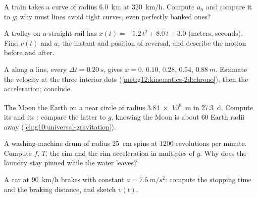 \begin{exercise}[$\star\star$]\label{exo:g12:kinematics-2d:6}
A  train takes a curve of radius \qty{6.0}{km} at
\qty{320}{km/h}. Compute $a_n$ and compare it to $g$; why must
 lines avoid tight curves, even perfectly banked ones?
\end{exercise}

\begin{exercise}[$\star\star$]\label{exo:g12:kinematics-2d:7}
A trolley on a straight rail has $x(t) = -1.2\,t^2 + 8.0\,t + 3.0$
(meters, seconds). Find $v(t)$ and $a$, the instant and position of
reversal, and describe the motion before and after.
\end{exercise}

\begin{exercise}[$\star\star$]\label{exo:g12:kinematics-2d:8}
A  along a line, every $\Delta t = \qty{0.20}{s}$,
gives $x = 0$, $0.10$, $0.28$, $0.54$, $\qty{0.88}{m}$. Estimate the
velocity at the three interior dots
(\cref{met:g12:kinematics-2d:chrono}), then the acceleration; conclude.
\end{exercise}

\begin{exercise}[$\star\star$]\label{exo:g12:kinematics-2d:9}
The Moon  the Earth on a near circle of radius \qty{3.84e8}{m}
in \qty{27.3}{d}. Compute its  and its ;
compare the latter to $g$, knowing the Moon is about $60$ Earth radii
away (\cref{ch:g10:universal-gravitation}).
\end{exercise}

\begin{exercise}[$\star\star$]\label{exo:g12:kinematics-2d:10}
A washing-machine drum of radius \qty{25}{cm} spins at $1200$
revolutions per minute. Compute $f$, $T$, the rim  and the rim
acceleration in multiples of $g$. Why does the laundry stay pinned
while the water leaves?
\end{exercise}

\begin{exercise}[$\star\star$]\label{exo:g12:kinematics-2d:11}
A car at \qty{90}{km/h} brakes with constant $a = \qty{7.5}{m/s^2}$:
compute the stopping time and the braking distance, and sketch $v(t)$.
\end{exercise}

